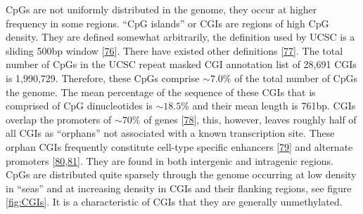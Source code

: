 \documentclass[
]{book}
\begin{document}
CpGs are not uniformly distributed in the genome, they occur at higher frequency in some regions.
``CpG islands'' or CGIs are regions of high CpG density.
They are defined somewhat arbitrarily, the definition used by UCSC is a sliding 500bp window {[}\protect\hyperlink{ref-Wu2010}{76}{]}.
There have existed other definitions {[}\protect\hyperlink{ref-Gardiner-Garden1987}{77}{]}.
The total number of CpGs in the UCSC repeat masked CGI annotation list of 28,691 CGIs is 1,990,729.
Therefore, these CpGs comprise \(\sim7.0\%\) of the total number of CpGs the genome. The mean percentage of the sequence of these CGIs that is comprised of CpG dinucleotides is \(\sim18.5\%\) and their mean length is 761bp.
CGIs overlap the promoters of \(\sim70\%\) of genes {[}\protect\hyperlink{ref-Saxonov2006}{78}{]}, this, however, leaves roughly half of all CGIs as ``orphans'' not associated with a known transcription site.
These orphan CGIs frequently constitute cell-type specific enhancers {[}\protect\hyperlink{ref-Bell2017}{79}{]} and alternate promoters {[}\protect\hyperlink{ref-Illingworth2010}{80},\protect\hyperlink{ref-Maunakea2010}{81}{]}.
They are found in both intergenic and intragenic regions.
CpGs are distributed quite sparsely through the genome occurring at low density in ``seas'' and at increasing density in CGIs and their flanking regions, see figure \ref{fig:CGIs}.
It is a characteristic of CGIs that they are generally unmethylated.
\end{document}
